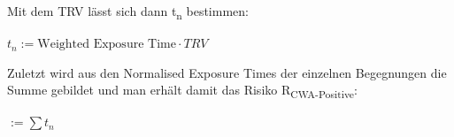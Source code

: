 \documentclass[conference]{IEEEtran}
\begin{document}
\centerline{\text{ }}








\centerline{\text{ }}

Mit dem TRV lässt sich dann t\textsubscript{n} bestimmen:

\centerline{\text{ }}
\centerline{$t_n := \text{Weighted Exposure Time}\cdot TRV$}
\centerline{\text{ }}

Zuletzt wird aus den Normalised Exposure Times der einzelnen Begegnungen die Summe gebildet und man erhält damit das Risiko R\textsubscript{CWA-Positive}:

\centerline{\text{ }}
\centerline{  $ := \sum t_n$}
\centerline{\text{ }}
\end{document}
